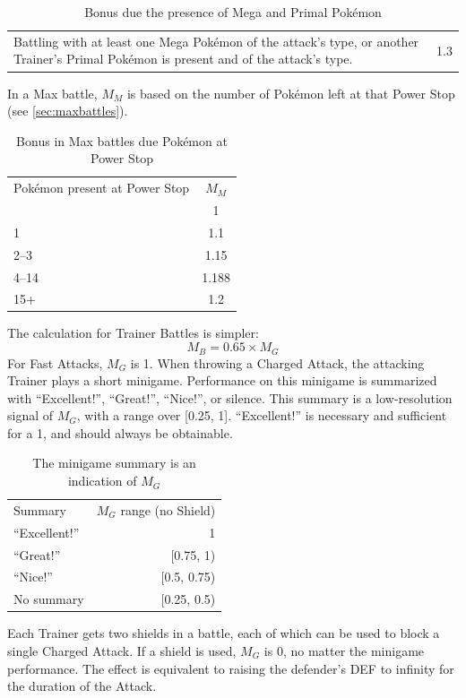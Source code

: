 \begin{itemize}
\begin{table}[h!]
\begin{tabular}{p{}c}
         Battling with at least one Mega Pokémon of the attack's type,
          or another Trainer's Primal Pokémon is present and of
          the attack's type. & 1.3 \\
       \end{tabular}
     \caption{Bonus due the presence of Mega and Primal Pokémon}
   \end{table}
   In a Max battle, $M_M$ is based on the number of Pokémon left at that Power Stop
     (see \autoref{sec:maxbattles}).
   \begin{table}[h!]
     \centering
       \begin{tabular}{lc}
         Pokémon present at Power Stop & $M_M$ \\
         \Midrule
         0 & 1 \\
         1 & 1.1 \\
         2--3 & 1.15 \\
         4--14 & 1.188 \\
         15+ & 1.2 \\
       \end{tabular}
     \caption{Bonus in Max battles due Pokémon at Power Stop\label{table:powerstopbonus}}
   \end{table}
\end{itemize}
The calculation for Trainer Battles is simpler:
\[ M_B = 0.65 \times M_G \]
For Fast Attacks, $M_G$ is 1.
When throwing a Charged Attack, the attacking Trainer plays a short minigame.
Performance on this minigame is summarized with ``Excellent!'', ``Great!'',
``Nice!'', or silence.
This summary is a low-resolution signal of $M_G$, with a range over [0.25, 1].
``Excellent!'' is necessary and sufficient for a 1, and should always be obtainable.
\begin{table}
\centering
\begin{tabular}{l r}
Summary & $M_G$ range (no Shield) \\
\Midrule
``Excellent!'' & 1 \\
``Great!'' & [0.75, 1) \\
``Nice!'' & [0.5, 0.75) \\
No summary & [0.25, 0.5) \\
\end{tabular}
\caption{The minigame summary is an indication of $M_G$}
\end{table}
Each Trainer gets two shields in a battle, each of which can be used
 to block a single Charged Attack.
If a shield is used, $M_G$ is 0, no matter the minigame performance.
The effect is equivalent to raising the defender's DEF to infinity for the
  duration of the Attack.


